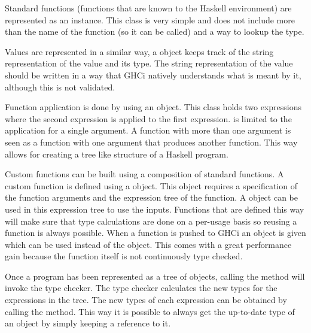 Standard functions (functions that are known to the Haskell environment) are represented as an  instance. 
This class is very simple and does not include more than the name of the function (so it can be called) and a way to lookup the type.

Values are represented in a similar way, a  object keeps track of the string representation of the value and its type. 
The string representation of the value should be written in a way that GHCi natively understands what is meant by it, although this is not validated.

Function application is done by using an  object. 
This class holds two expressions where the second expression is applied to the first expression.
 is limited to the application for a single argument.
A function with more than one argument is seen as a function with one argument that produces another function.
This way  allows for creating a tree like structure of a Haskell program.

Custom functions can be built using a composition of standard functions.
A custom function is defined using a  object.
This object requires a specification of the function arguments and the expression tree of the function.
A  object can be used in this expression tree to use the inputs.
Functions that are defined this way will make sure that type calculations are done on a per-usage basis so reusing a function is always possible.
When a function is pushed to GHCi an  object is given which can be used instead of the  object.
This comes with a great performance gain because the function itself is not continuously type checked.

Once a program has been represented as a tree of  objects, calling the  method will invoke the type checker.
The type checker calculates the new types for the expressions in the tree.
The new types of each expression can be obtained by calling the  method.
This way it is possible to always get the up-to-date type of an  object by simply keeping a reference to it.

